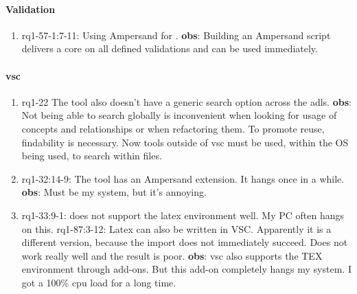 \paragraph{Validation}
\begin{enumerate}
    \item rq1-57-1:7-11: Using Ampersand for .
    \newline\textbf{obs}: Building an Ampersand script delivers a core on all defined validations and can be used immediately.

\end{enumerate}

\paragraph{\acrlong{vsc}}
\begin{enumerate}
    \item rq1-22 The tool  also doesn't have a generic search option across the adls.
    \newline\textbf{obs}: Not being able to search globally is inconvenient when looking for usage of concepts and relationships or when refactoring them.
    To promote reuse, findability is necessary.
    Now tools outside of \acrshort{vsc} must be used, within the OS being used, to search within files.

    \item rq1-32:14-9: The tool  has an Ampersand extension.
    It hangs once in a while.
    \newline\textbf{obs}: Must be my system, but it's annoying.

    \item rq1-33:9-1:  does not support the {latex} environment well.
    My PC often hangs on this.
    \newline rq1-87:3-12: Latex can also be written in VSC.
    Apparently it is a different version, because the import does not immediately succeed.
    Does not work really well and the result is poor.
    \newline\textbf{obs}: \acrlong{vsc} also supports the TEX environment through add-ons.
    But this add-on completely hangs my system.
    I got a 100\% cpu load for a long time. 
    
\end{enumerate}


\newpage
